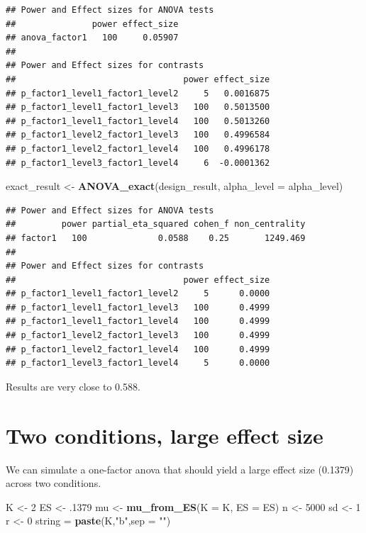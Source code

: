 \documentclass[]{book}
\newenvironment{Shaded}{\begin{snugshade}}{\end{snugshade}}
\newcommand{\DataTypeTok}[1]{\textcolor[rgb]{0.13,0.29,0.53}{#1}}
\newcommand{\DecValTok}[1]{\textcolor[rgb]{0.00,0.00,0.81}{#1}}
\newcommand{\FloatTok}[1]{\textcolor[rgb]{0.00,0.00,0.81}{#1}}
\newcommand{\KeywordTok}[1]{\textcolor[rgb]{0.13,0.29,0.53}{\textbf{#1}}}
\newcommand{\NormalTok}[1]{#1}
\newcommand{\StringTok}[1]{\textcolor[rgb]{0.31,0.60,0.02}{#1}}
\begin{document}
\begin{verbatim}
## Power and Effect sizes for ANOVA tests
##               power effect_size
## anova_factor1   100     0.05907
## 
## Power and Effect sizes for contrasts
##                                 power effect_size
## p_factor1_level1_factor1_level2     5   0.0016875
## p_factor1_level1_factor1_level3   100   0.5013500
## p_factor1_level1_factor1_level4   100   0.5013260
## p_factor1_level2_factor1_level3   100   0.4996584
## p_factor1_level2_factor1_level4   100   0.4996178
## p_factor1_level3_factor1_level4     6  -0.0001362
\end{verbatim}

\begin{Shaded}
\begin{Highlighting}[]
\NormalTok{exact_result <-}\StringTok{ }\KeywordTok{ANOVA_exact}\NormalTok{(design_result, }\DataTypeTok{alpha_level =}\NormalTok{ alpha_level)}
\end{Highlighting}
\end{Shaded}

\begin{verbatim}
## Power and Effect sizes for ANOVA tests
##         power partial_eta_squared cohen_f non_centrality
## factor1   100              0.0588    0.25       1249.469
## 
## Power and Effect sizes for contrasts
##                                 power effect_size
## p_factor1_level1_factor1_level2     5      0.0000
## p_factor1_level1_factor1_level3   100      0.4999
## p_factor1_level1_factor1_level4   100      0.4999
## p_factor1_level2_factor1_level3   100      0.4999
## p_factor1_level2_factor1_level4   100      0.4999
## p_factor1_level3_factor1_level4     5      0.0000
\end{verbatim}

Results are very close to 0.588.

\hypertarget{two-conditions-large-effect-size}{%
\section{Two conditions, large effect size}\label{two-conditions-large-effect-size}}

We can simulate a one-factor anova that should yield a large effect size (0.1379) across two conditions.

\begin{Shaded}
\begin{Highlighting}[]
\NormalTok{K <-}\StringTok{ }\DecValTok{2}
\NormalTok{ES <-}\StringTok{ }\FloatTok{.1379}
\NormalTok{mu <-}\StringTok{ }\KeywordTok{mu_from_ES}\NormalTok{(}\DataTypeTok{K =}\NormalTok{ K, }\DataTypeTok{ES =}\NormalTok{ ES)}
\NormalTok{n <-}\StringTok{ }\DecValTok{5000}
\NormalTok{sd <-}\StringTok{ }\DecValTok{1}
\NormalTok{r <-}\StringTok{ }\DecValTok{0}
\NormalTok{string =}\StringTok{ }\KeywordTok{paste}\NormalTok{(K,}\StringTok{"b"}\NormalTok{,}\DataTypeTok{sep =} \StringTok{""}\NormalTok{)}
\end{Highlighting}
\end{Shaded}
\end{document}
